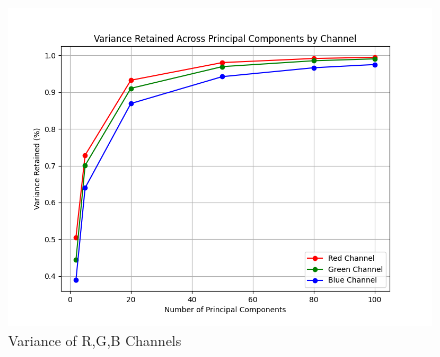 \documentclass[11pt]{article}
\begin{document}
\begin{figure}[htbp]
    	\centering
    	\includegraphics[width=\textwidth]{figures/hw3_1_2.png}
    	\caption{Variance of R,G,B Channels}
		\label{fig:variance_lena}
\end{figure}
\end{document}
